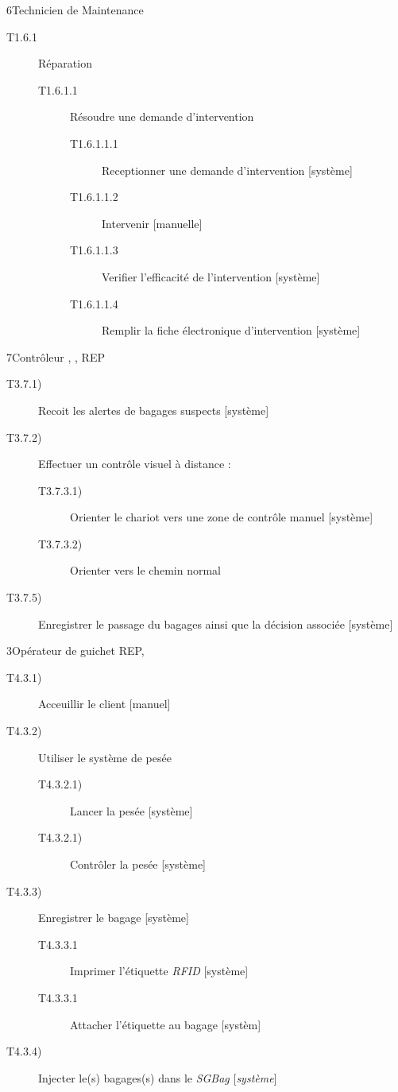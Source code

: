 \dta
{6}{Technicien de Maintenance}{}
{
\begin{description}
	\item[T1.6.1] Réparation 
	\begin{description}
		\item[T1.6.1.1] Résoudre une demande d'intervention 
		\begin{description}
			\item[T1.6.1.1.1] Receptionner une demande d'intervention [système]
			\item[T1.6.1.1.2] Intervenir [manuelle]
			\item[T1.6.1.1.3] Verifier l'efficacité de l'intervention [système]
			\item[T1.6.1.1.4] Remplir la fiche électronique d'intervention [système]
		\end{description}
	\end{description}
\end{description}
}

\dta
{7}{Contrôleur}
{, , REP}
{
\begin{description}
	\item [T3.7.1)] Recoit les alertes de bagages suspects [système]
	\item [T3.7.2)] Effectuer un contrôle visuel à distance : 
	\begin{description}
		\item [T3.7.3.1)] Orienter le chariot vers une zone de contrôle manuel [système]
		\item [T3.7.3.2)] Orienter vers le chemin \og normal\fg [système]
	\end{description}
	\item [T3.7.5)] Enregistrer le passage du bagages ainsi que la décision associée [système]
\end{description}
}

\dta
{3}{Opérateur de guichet}
{REP, }
{
\begin{description}
	\item [T4.3.1)] Acceuillir le client [manuel]
	\item [T4.3.2)] Utiliser le système de pesée
	\begin{description}
		\item [T4.3.2.1)] Lancer la pesée [système]
		\item [T4.3.2.1)] Contrôler la pesée [système]
	\end{description}
	\item [T4.3.3)] Enregistrer le bagage [système]
	\begin{description}
		\item [T4.3.3.1] Imprimer l'étiquette \textsl{RFID} [système]
		\item [T4.3.3.1] Attacher l'étiquette au bagage [systèm]
	\end{description}
	\item [T4.3.4)] Injecter le(s) bagages(s) dans le \textsl{SGBag}  [\textsl{système}]
\end{description}
}

